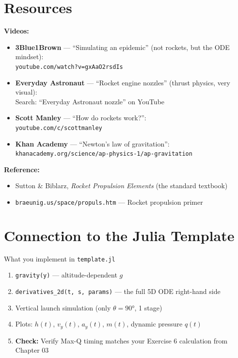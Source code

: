 \documentclass[12pt, a4paper]{article}
\begin{document}
\begin{solutionspace}[8cm]
\end{solutionspace}

\section{Resources}

\begin{hintbox}
\textbf{Videos:}
\begin{itemize}
  \item \textbf{3Blue1Brown} — ``Simulating an epidemic'' (not rockets, but the ODE mindset):\\
        \texttt{youtube.com/watch?v=gxAaO2rsdIs}
  \item \textbf{Everyday Astronaut} — ``Rocket engine nozzles'' (thrust physics, very visual):\\
        Search: ``Everyday Astronaut nozzle'' on YouTube
  \item \textbf{Scott Manley} — ``How do rockets work?'':\\
        \texttt{youtube.com/c/scottmanley}
  \item \textbf{Khan Academy} — ``Newton's law of gravitation'':\\
        \texttt{khanacademy.org/science/ap-physics-1/ap-gravitation}
\end{itemize}
\textbf{Reference:}
\begin{itemize}
  \item Sutton \& Biblarz, \textit{Rocket Propulsion Elements} (the standard textbook)
  \item \texttt{braeunig.us/space/propuls.htm} — Rocket propulsion primer
\end{itemize}
\end{hintbox}

\section{Connection to the Julia Template}

\begin{theorybox}{What you implement in \texttt{template.jl}}
\begin{enumerate}
  \item \texttt{gravity(y)} — altitude-dependent $g$
  \item \texttt{derivatives\_2d(t, s, params)} — the full 5D ODE right-hand side
  \item Vertical launch simulation (only $\theta=90°$, 1 stage)
  \item Plots: $h(t)$, $v_y(t)$, $a_y(t)$, $m(t)$, dynamic pressure $q(t)$
  \item \textbf{Check:} Verify Max-Q timing matches your Exercise 6 calculation from Chapter 03
\end{enumerate}
\end{theorybox}
\end{document}
